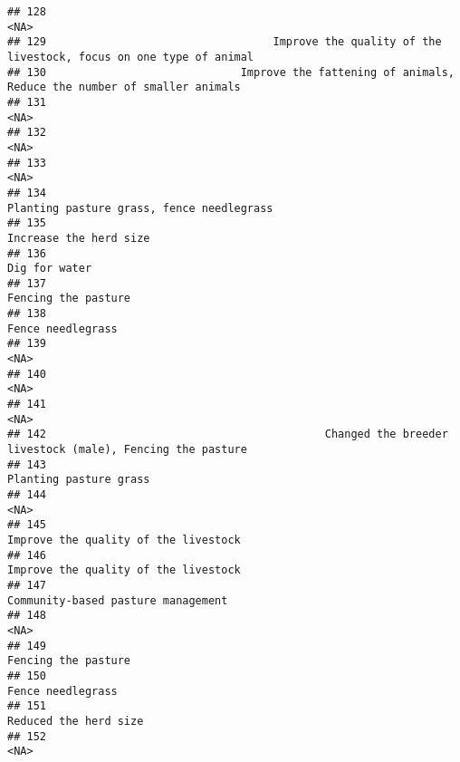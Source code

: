 \documentclass[
]{article}
\begin{document}
\begin{verbatim}
## 128                                                                                                <NA>
## 129                                   Improve the quality of the livestock, focus on one type of animal
## 130                              Improve the fattening of animals, Reduce the number of smaller animals
## 131                                                                                                <NA>
## 132                                                                                                <NA>
## 133                                                                                                <NA>
## 134                                                           Planting pasture grass, fence needlegrass
## 135                                                                              Increase the herd size
## 136                                                                                       Dig for water
## 137                                                                                 Fencing the pasture
## 138                                                                                   Fence needlegrass
## 139                                                                                                <NA>
## 140                                                                                                <NA>
## 141                                                                                                <NA>
## 142                                           Changed the breeder livestock (male), Fencing the pasture
## 143                                                                              Planting pasture grass
## 144                                                                                                <NA>
## 145                                                                Improve the quality of the livestock
## 146                                                                Improve the quality of the livestock
## 147                                                                  Community-based pasture management
## 148                                                                                                <NA>
## 149                                                                                 Fencing the pasture
## 150                                                                                   Fence needlegrass
## 151                                                                               Reduced the herd size
## 152                                                                                                <NA>

\end{verbatim}
\end{document}

